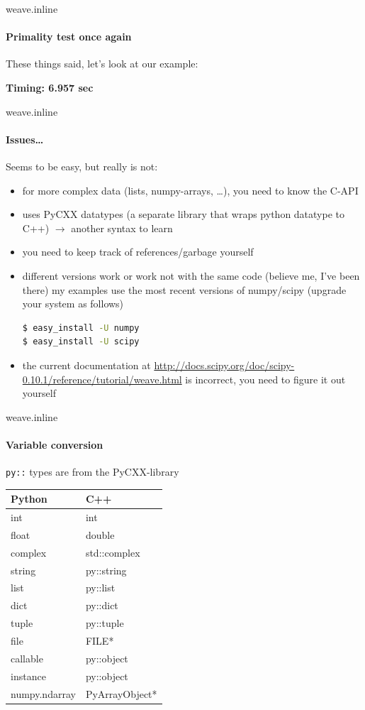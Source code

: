 \documentclass[german]{beamer}
\newcommand{\ra}{\text{$\rightarrow$}}
\begin{document}
\begin{frame}[fragile]{weave.inline}
  \framesubtitle{Primality test once again}
  These things said, let's look at our example:
  
  
{\bf  Timing: 6.957 sec}
\end{frame}
\begin{frame}[fragile]{weave.inline}
  \framesubtitle{Issues\ldots}
  Seems to be easy, but really is not:
  \begin{itemize}
  \item for more complex data (lists, numpy-arrays, \ldots), you need
    to know the C-API
  \item uses PyCXX datatypes (a separate library that wraps python
    datatype to C++) $\ra$ another syntax to learn
  \item you need to keep track of references/garbage yourself
  \item different versions work or work not with the same code
    (believe me, I've been there) \ra my examples use the most recent
    versions of numpy/scipy (upgrade your system as follows)
    \begin{lstlisting}[language=bash]
$ easy_install -U numpy
$ easy_install -U scipy
    \end{lstlisting}
  \item the current documentation at
    \url{http://docs.scipy.org/doc/scipy-0.10.1/reference/tutorial/weave.html}
    is incorrect, you need to figure it out yourself
  \end{itemize}
\end{frame}
\begin{frame}[fragile]{weave.inline}
  \framesubtitle{Variable conversion}
{\tt py::} types are from the PyCXX-library

\begin{tabular}{l|l}
Python &	C++\\\hline
int &	int\\
float	 &double\\
complex &	std::complex\\
string &	py::string\\
list &	py::list\\
dict &	py::dict\\
tuple &	py::tuple\\
file &	FILE*\\
callable &	py::object\\
instance &	py::object\\
numpy.ndarray &	PyArrayObject*\\
\end{tabular}
\end{frame}
\end{document}
